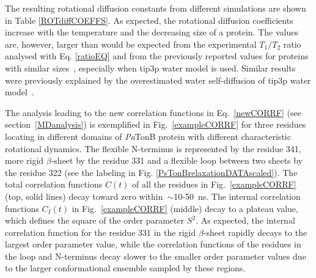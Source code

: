 \documentclass[pre,aps,floatfix,authordate1-4,twocolumn]{revtex4-1}
\begin{document}
The resulting rotational diffusion constants from different simulations are
shown in Table \ref{ROTdiffCOEFFS}.
As expected, the rotational diffusion coefficients
increase with the temperature and the decreasing size of a protein.
The values are, however, larger than would be  
expected from the experimental $T_1/T_2$ ratio analysed with Eq. \ref{ratioEQ}
and from the previously reported values for proteins with similar
sizes~\cite{krishnan98}, especially when tip3p water model is used.
Similar results were previously explained by the overestimated water
self-diffusion of tip3p water model~\cite{wong08}.

The analysis leading to the new correlation functions in Eq.~\ref{newCORRF}
(see section~\ref{MDanalysis}) is exemplified in
Fig.~\ref{exampleCORRF} for three residues locating in different domains of {\it Pa}TonB
protein with different characteristic rotational dynamics.
The flexible N-terminus is represented by the residue 341,
more rigid $\beta$-sheet by the residue 331 and a
flexible loop between two sheets by the residue 322
(see the labeling in Fig. \ref{PsTonBrelaxationDATAscaled}). 
The total correlation functions $C(t)$
of all the residues in Fig.~\ref{exampleCORRF}  (top, solid lines) 
decay toward zero within~$\sim$10-50~ns.
The internal correlation functions $C_I(t)$ in Fig.~\ref{exampleCORRF} (middle)
decay to a plateau value, which defines the square of the order parameter $S^2$.
As expected, the internal correlation function for the residue 331 in the
rigid $\beta$-sheet rapidly decays to the largest order parameter value,
while the correlation functions of the residues in the loop and N-terminus 
decay slower to the smaller order parameter values due to the larger conformational ensemble
sampled by these regions.
\end{document}
